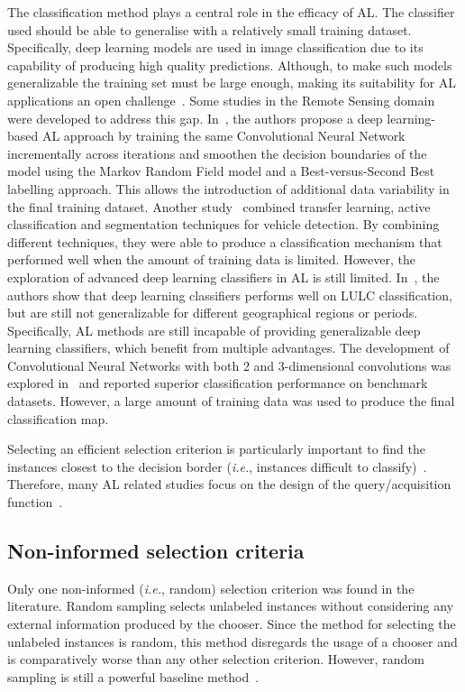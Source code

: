 The classification method plays a central role in the efficacy of AL. The
classifier used should be able to generalise with a relatively small training
dataset. Specifically, deep learning models are used in image classification
due to its capability of producing high quality predictions. Although, to make
such models generalizable the training set must be large enough, making its
suitability for AL applications an open challenge~\cite{Cao2020, Wu2020,
Bi2019}. Some studies in the Remote Sensing domain were developed to address
this gap. In~\cite{Cao2020, Bi2019}, the authors propose a deep learning-based
AL approach by training the same Convolutional Neural Network incrementally
across iterations and smoothen the decision boundaries of the model using the
Markov Random Field model and a Best-versus-Second Best labelling approach.
This allows the introduction of additional data variability in the final
training dataset. Another study~\cite{Wu2020} combined transfer learning,
active classification and segmentation techniques for vehicle detection. By
combining different techniques, they were able to produce a classification
mechanism that performed well when the amount of training data is limited.
However, the exploration of advanced deep learning classifiers in AL is
still limited. In~\cite{Hu2020}, the authors show that deep learning
classifiers performs well on LULC classification, but are still not
generalizable for different geographical regions or periods. Specifically, AL
methods are still incapable of providing generalizable deep learning
classifiers, which benefit from multiple advantages. The development of
Convolutional Neural Networks with both 2 and 3-dimensional convolutions was
explored in~\cite{Roy2019} and reported superior classification performance on
benchmark datasets. However, a large amount of training data was used to
produce the final classification map.

Selecting an efficient selection criterion is particularly important to find
the instances closest to the decision border (\textit{i.e.}, instances
difficult to classify)~\cite{Shrivastava2021}. Therefore, many AL related
studies focus on the design of the query/acquisition function~\cite{Su2020}.

\subsection{Non-informed selection criteria}

Only one non-informed (\textit{i.e.}, random) selection criterion was found in
the literature. Random sampling selects unlabeled instances without
considering any external information produced by the chooser. Since the method
for selecting the unlabeled instances is random, this method disregards the
usage of a chooser and is comparatively worse than any other selection
criterion. However, random sampling is still a powerful baseline
method~\cite{Cawley2011}. 

